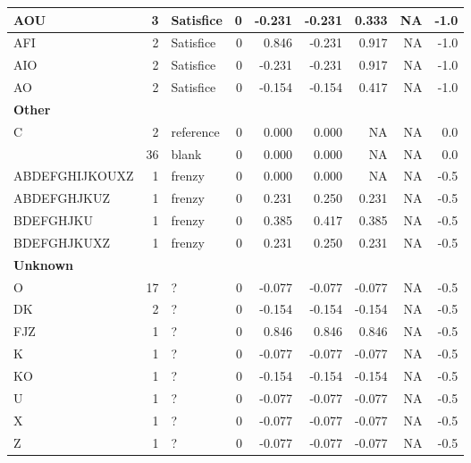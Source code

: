 \documentclass[
  letterpaper,
  DIV=11,
  numbers=noendperiod]{scrreprt}
\begin{document}
\begin{tabular}[t]{l|r|l|r|r|r|r|r|r}
\hline
\hspace{1em}AOU & 3 & Satisfice & 0 & -0.231 & -0.231 & 0.333 & NA & -1.0\\
\hline
\hspace{1em}AFI & 2 & Satisfice & 0 & 0.846 & -0.231 & 0.917 & NA & -1.0\\
\hline
\hspace{1em}AIO & 2 & Satisfice & 0 & -0.231 & -0.231 & 0.917 & NA & -1.0\\
\hline
\hspace{1em}AO & 2 & Satisfice & 0 & -0.154 & -0.154 & 0.417 & NA & -1.0\\
\hline
\multicolumn{9}{l}{\textbf{Other}}\\
\hline
\hspace{1em}C & 2 & reference & 0 & 0.000 & 0.000 & NA & NA & 0.0\\
\hline
\hspace{1em} & 36 & blank & 0 & 0.000 & 0.000 & NA & NA & 0.0\\
\hline
\hspace{1em}ABDEFGHIJKOUXZ & 1 & frenzy & 0 & 0.000 & 0.000 & NA & NA & -0.5\\
\hline
\hspace{1em}ABDEFGHJKUZ & 1 & frenzy & 0 & 0.231 & 0.250 & 0.231 & NA & -0.5\\
\hline
\hspace{1em}BDEFGHJKU & 1 & frenzy & 0 & 0.385 & 0.417 & 0.385 & NA & -0.5\\
\hline
\hspace{1em}BDEFGHJKUXZ & 1 & frenzy & 0 & 0.231 & 0.250 & 0.231 & NA & -0.5\\
\hline
\multicolumn{9}{l}{\textbf{Unknown}}\\
\hline
\hspace{1em}O & 17 & ? & 0 & -0.077 & -0.077 & -0.077 & NA & -0.5\\
\hline
\hspace{1em}DK & 2 & ? & 0 & -0.154 & -0.154 & -0.154 & NA & -0.5\\
\hline
\hspace{1em}FJZ & 1 & ? & 0 & 0.846 & 0.846 & 0.846 & NA & -0.5\\
\hline
\hspace{1em}K & 1 & ? & 0 & -0.077 & -0.077 & -0.077 & NA & -0.5\\
\hline
\hspace{1em}KO & 1 & ? & 0 & -0.154 & -0.154 & -0.154 & NA & -0.5\\
\hline
\hspace{1em}U & 1 & ? & 0 & -0.077 & -0.077 & -0.077 & NA & -0.5\\
\hline
\hspace{1em}X & 1 & ? & 0 & -0.077 & -0.077 & -0.077 & NA & -0.5\\
\hline
\hspace{1em}Z & 1 & ? & 0 & -0.077 & -0.077 & -0.077 & NA & -0.5\\
\hline
\end{tabular}
\end{document}
